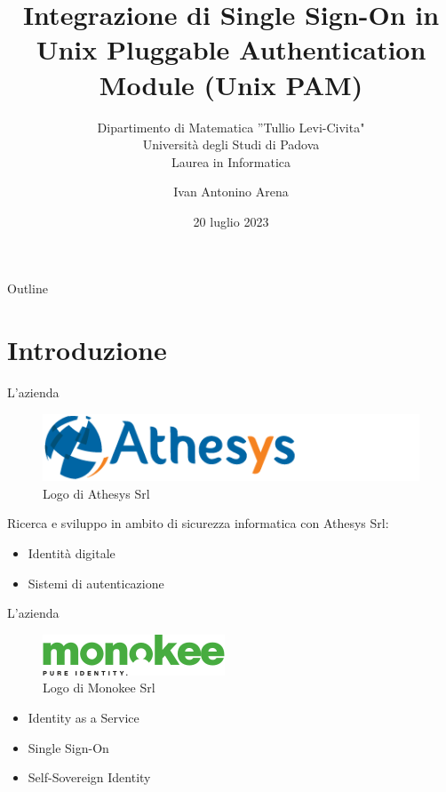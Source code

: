 \documentclass{beamer}
\title{Integrazione di Single Sign-On in Unix Pluggable Authentication Module (Unix PAM)}
\subtitle{Dipartimento di Matematica ”Tullio Levi-Civita" \\ Università degli Studi di Padova \\ Laurea in Informatica}
\author{Ivan Antonino Arena}
\date{20 luglio 2023}
\begin{document}
	\maketitle

	\begin{frame}{Outline}
		\tableofcontents
	\end{frame}


	\section{Introduzione}
	
	\begin{frame}{L'azienda}
		
		\begin{figure}[H] 
			\centering 
			\includegraphics[width=0.4\columnwidth]{immagini/logo-athesys} 
			\caption{Logo di Athesys Srl}
			\label{fig:athesys}
		\end{figure}
		
		Ricerca e sviluppo in ambito di sicurezza informatica con Athesys Srl:
		
		\begin{itemize}
			\item Identità digitale \vspace{.5em}
			\item Sistemi di autenticazione \vspace{.5em}
		\end{itemize}
	\end{frame}
	
	
	\begin{frame}{L'azienda}
		\begin{figure}[H] 
			\centering 
			\includegraphics[width=0.4\columnwidth]{immagini/logo-monokee} 
			\caption{Logo di Monokee Srl}
			\label{fig:monokee}
		\end{figure}


		\begin{itemize}
			\item Identity as a Service \vspace{.5em}
			\item Single Sign-On \vspace{.5em}
			\item Self-Sovereign Identity \vspace{.5em}
		\end{itemize}	
	\end{frame}
	
\end{document}
